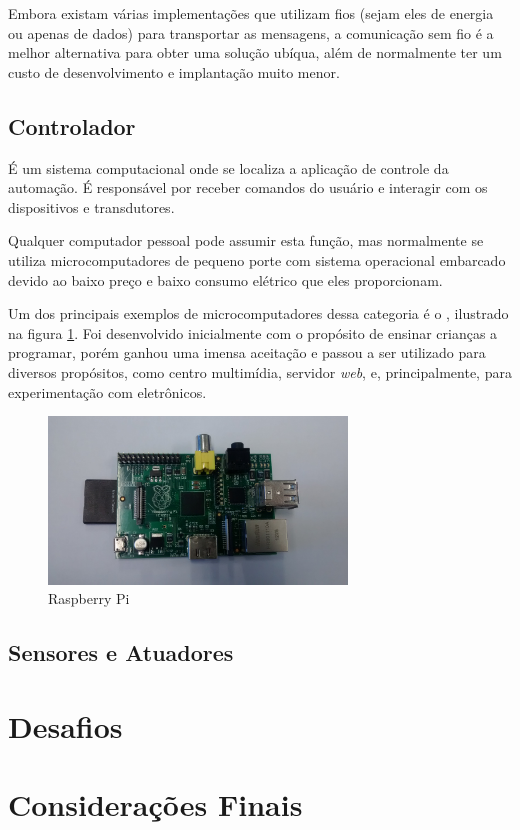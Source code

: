 Embora existam várias implementações que utilizam fios (sejam eles de energia ou apenas de dados) para
transportar as mensagens, a comunicação sem fio é a melhor alternativa para obter uma solução ubíqua, além de
normalmente ter um custo de desenvolvimento e implantação muito menor.

\subsection{Controlador}
É um sistema computacional onde se localiza a aplicação de controle da automação. É responsável por receber comandos do
usuário e interagir com os dispositivos e transdutores.

Qualquer computador pessoal pode assumir esta função, mas normalmente se utiliza microcomputadores de pequeno porte com sistema
operacional embarcado devido ao baixo preço e baixo consumo elétrico que eles proporcionam.

Um dos principais exemplos de microcomputadores dessa categoria é o , ilustrado na figura
\ref{figura:pi}. Foi desenvolvido inicialmente com o propósito de ensinar crianças a programar, porém ganhou uma
imensa aceitação e passou a ser utilizado para diversos propósitos, como centro multimídia, servidor
\textit{web}, e, principalmente, para experimentação com eletrônicos. \cite{schmidt2014}

\begin{figure}[h]
	\centering
	\includegraphics[width=300]{../images/raspeberry.jpg}
	\caption{Raspberry Pi}
	\label{figura:pi}
\end{figure}

\subsection{Sensores e Atuadores}


\section{Desafios}

\section {Considerações Finais}
